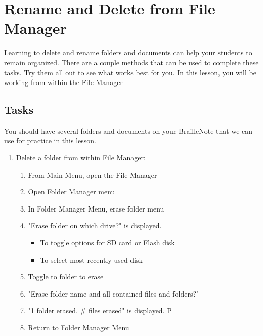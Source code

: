 \documentclass[10pt,letterpaper,twoside]{report}
\begin{document}
\section{Rename and Delete from File Manager}
Learning to delete and rename folders and documents can help your students to remain organized. There are a couple methods that can be used to complete these tasks. Try them all out to see what works best for you.  In this lesson, you will be working from within the File Manager
\subsection{Tasks}
You should have several folders and documents on your BrailleNote that we can use for practice in this lesson.
\begin{enumerate}
	\item Delete a folder from within File Manager:
	      \begin{enumerate}
		      \item From Main Menu, open the File Manager 
		      \item Open Folder Manager menu 
		      \item In Folder Manager Menu, erase folder menu 
		      \item "Erase folder on which drive?" is displayed.
		            \begin{itemize}
			            \item To toggle options for SD card or Flash disk 
			            \item To select most recently used disk 
		            \end{itemize}
		      \item Toggle to folder to erase 
		      \item "Erase folder name and all contained files and folders?" 
		      \item "1 folder erased. \# files erased" is displayed. P
		      \item Return to Folder Manager Menu 

\end{enumerate}
\end{enumerate}
\end{document}
